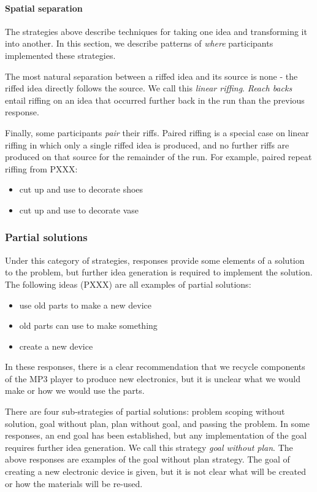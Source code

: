 \paragraph{Spatial separation}

The strategies above describe techniques for taking one idea and transforming it into another. In this section, we describe patterns of \emph{where} participants implemented these strategies.

The most natural separation between a riffed idea and its source is none - the riffed idea directly follows the source. We call this \emph{linear riffing}.
\emph{Reach backs} entail riffing on an idea that occurred further back in the run than the previous response. 

Finally, some participants \emph{pair} their riffs. Paired riffing is a special case on linear riffing in which only a single riffed idea is produced, and no further riffs are produced on that source for the remainder of the run. For example, paired repeat riffing from PXXX:

\begin{itemize}
\item cut up and use to decorate shoes
\item cut up and use to decorate vase
\end{itemize}


\subsubsection{Partial solutions}

Under this category of strategies, responses provide some elements of a solution to the problem, but further idea generation is required to implement the solution. The following ideas (PXXX) are all examples of partial solutions:

\begin{itemize}
    \item use old parts to make a new device
    \item old parts can use to make something
    \item create a new device
\end{itemize}

In these responses, there is a clear recommendation that we recycle components of the MP3 player to produce new electronics, but it is unclear what we would make or how we would use the parts. 

There are four sub-strategies of partial solutions: problem scoping without solution, goal without plan, plan without goal, and passing the problem. 
In some responses, an end goal has been established, but any implementation of the goal requires further idea generation. We call this strategy \emph{goal without plan}. The above responses are examples of the goal without plan strategy.
The goal of creating a new electronic device is given, but it is not clear what will be created or how the materials will be re-used.

